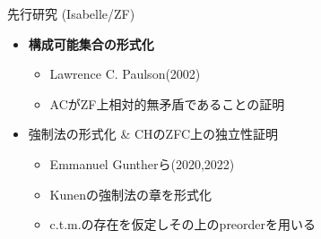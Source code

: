 \documentclass[17pt,aspectratio=169]{beamer}
\begin{document}
\begin{frame}{先行研究 (Isabelle/ZF)}


    \begin{itemize}
        \vspace{10pt}

        \item \textbf{構成可能集合の形式化}
              {\small \begin{itemize}
                      \item Lawrence C. Paulson(2002)
                      \item ACがZF上相対的無矛盾であることの証明
                  \end{itemize} }

        \item 強制法の形式化 \& CHのZFC上の独立性証明
              {\small \begin{itemize}
                  \item Emmanuel Guntherら(2020,2022)
                  \item Kunenの強制法の章を形式化
                  \item c.t.m.の存在を仮定しその上のpreorderを用いる
              \end{itemize} }

    \end{itemize}
\end{frame}
\end{document}
